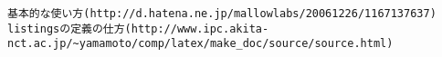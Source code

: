 \begin{thebibliography}{99}
  \verb|基本的な使い方(http://d.hatena.ne.jp/mallowlabs/20061226/1167137637)|
  \verb|listingsの定義の仕方(http://www.ipc.akita-nct.ac.jp/~yamamoto/comp/latex/make_doc/source/source.html)|
\end{thebibliography}
